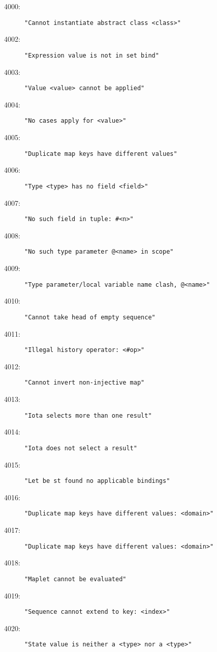 %
%
%

\begin{description}
\item[4000:] \texttt{"Cannot instantiate abstract class <class>"}
\item[4002:] \texttt{"Expression value is not in set bind"}
\item[4003:] \texttt{"Value <value> cannot be applied"}
\item[4004:] \texttt{"No cases apply for <value>"}
\item[4005:] \texttt{"Duplicate map keys have different values"}
\item[4006:] \texttt{"Type <type> has no field <field>"}
\item[4007:] \texttt{"No such field in tuple:\ \#<n>"}
\item[4008:] \texttt{"No such type parameter @<name> in scope"}
\item[4009:] \texttt{"Type parameter/local variable name clash, @<name>"}
\item[4010:] \texttt{"Cannot take head of empty sequence"}
\item[4011:] \texttt{"Illegal history operator:\ <\#op>"}
\item[4012:] \texttt{"Cannot invert non-injective map"}
\item[4013:] \texttt{"Iota selects more than one result"}
\item[4014:] \texttt{"Iota does not select a result"}
\item[4015:] \texttt{"Let be st found no applicable bindings"}
\item[4016:] \texttt{"Duplicate map keys have different values:\ <domain>"}
\item[4017:] \texttt{"Duplicate map keys have different values:\ <domain>"}
\item[4018:] \texttt{"Maplet cannot be evaluated"}
\item[4019:] \texttt{"Sequence cannot extend to key:\ <index>"}
\item[4020:] \texttt{"State value is neither a <type> nor a <type>"}

\end{description}
